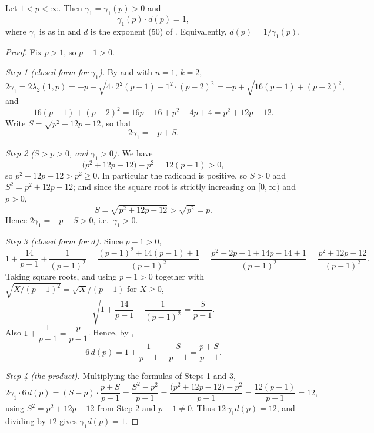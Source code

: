 \begin{lemma}
Let $1<p<\infty$.  Then $\gamma_1=\gamma_1(p)>0$ and
\[
  \gamma_1(p)\cdot d(p)=1,
\]
where $\gamma_1$ is as in  and $d$ is the exponent (50) of
.  Equivalently, $d(p)=1/\gamma_1(p)$.
\end{lemma}
\begin{proof}
Fix $p>1$, so $p-1>0$.

\emph{Step 1 (closed form for $\gamma_1$).}  By  and
 with $n=1$, $k=2$,
\[
  2\gamma_1=2\lambda_2(1,p)=-p+\sqrt{4\cdot2^2(p-1)+1^2\cdot(p-2)^2}
  =-p+\sqrt{16(p-1)+(p-2)^2},
\]
and
\[
  16(p-1)+(p-2)^2=16p-16+p^2-4p+4=p^2+12p-12 .
\]
Write $S=\sqrt{p^2+12p-12}$, so that
\[
  2\gamma_1=-p+S .
\]

\emph{Step 2 ($S>p>0$, and $\gamma_1>0$).}  We have
\[
  \bigl(p^2+12p-12\bigr)-p^2=12(p-1)>0 ,
\]
so $p^2+12p-12>p^2\ge0$.  In particular the radicand is positive, so
$S>0$ and $S^2=p^2+12p-12$; and since the square root is strictly increasing
on $[0,\infty)$ and $p>0$,
\[
  S=\sqrt{p^2+12p-12}>\sqrt{p^2}=p .
\]
Hence $2\gamma_1=-p+S>0$, i.e.\ $\gamma_1>0$.

\emph{Step 3 (closed form for $d$).}  Since $p-1>0$,
\[
  1+\frac{14}{p-1}+\frac{1}{(p-1)^2}
  =\frac{(p-1)^2+14(p-1)+1}{(p-1)^2}
  =\frac{p^2-2p+1+14p-14+1}{(p-1)^2}
  =\frac{p^2+12p-12}{(p-1)^2}.
\]
Taking square roots, and using $p-1>0$ together with
$\sqrt{X/(p-1)^2}=\sqrt X/(p-1)$ for $X\ge0$,
\[
  \sqrt{1+\frac{14}{p-1}+\frac{1}{(p-1)^2}}=\frac{S}{p-1}.
\]
Also $1+\dfrac1{p-1}=\dfrac{p}{p-1}$.  Hence, by ,
\[
  6\,d(p)=1+\frac1{p-1}+\frac{S}{p-1}=\frac{p+S}{p-1}.
\]

\emph{Step 4 (the product).}  Multiplying the formulas of Steps 1 and 3,
\[
  2\gamma_1\cdot 6\,d(p)=(S-p)\cdot\frac{p+S}{p-1}
  =\frac{S^2-p^2}{p-1}
  =\frac{\bigl(p^2+12p-12\bigr)-p^2}{p-1}
  =\frac{12(p-1)}{p-1}=12 ,
\]
using $S^2=p^2+12p-12$ from Step 2 and $p-1\neq0$.  Thus
$12\,\gamma_1 d(p)=12$, and dividing by $12$ gives $\gamma_1 d(p)=1$.
\end{proof}
